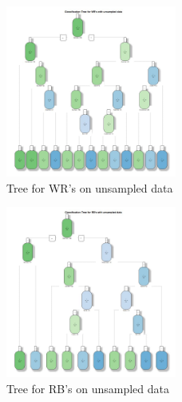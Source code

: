 \documentclass[]{article}
\begin{document}
\begin{figure}
\hypertarget{id}{%
\centering
\includegraphics[width=0.5\textwidth,height=\textheight]{../../Project_Scripts/WRtreeNS.jpg}
\caption{Tree for WR's on unsampled data}\label{id}
}
\end{figure}

\begin{figure}
\hypertarget{id}{%
\centering
\includegraphics[width=0.5\textwidth,height=\textheight]{../../Project_Scripts/RBtreeNS.jpg}
\caption{Tree for RB's on unsampled data}\label{id}
}
\end{figure}
\end{document}
